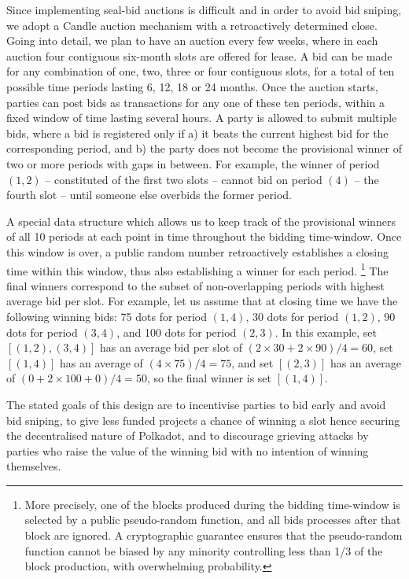 Since implementing seal-bid auctions is difficult and in order to avoid bid sniping, we adopt a Candle auction \cite{Fuellbrunn:2012:CandleAuction} mechanism with a retroactively determined close. 
Going into detail, we plan to have an auction every few weeks, where in each auction four contiguous six-month slots are offered for lease. A bid can be made for any combination of one, two, three or four contiguous slots, for a total of ten possible time periods lasting 6, 12, 18 or 24 months. Once the auction starts, parties can post bids as transactions for any one of these ten periods, within a fixed window of time lasting several hours. A party is allowed to submit multiple bids, where a bid is registered only if a) it beats the current highest bid for the corresponding period, and b) the party does not become the provisional winner of two or more periods with gaps in between. For example, the winner of period $(1,2)$ -- constituted of the first two slots -- cannot bid on period $(4)$ -- the fourth slot -- until someone else overbids the former period. 

A special data structure which allows us to keep track of the provisional winners of all 10 periods at each point in time throughout the bidding time-window. Once this window is over, a public random number retroactively establishes a closing time within this window, thus also establishing a winner for each period.%
\footnote{More precisely, one of the blocks produced during the bidding time-window is selected by a public pseudo-random function, and all bids processes after that block are ignored. A cryptographic guarantee ensures that the pseudo-random function cannot be biased by any minority controlling less than 1/3 of the block production, with overwhelming probability.} %
The final winners correspond to the subset of non-overlapping periods with highest average bid per slot. For example, let us assume that at closing time we have the following winning bids: 75 dots for period $(1,4)$, 30 dots for period $(1,2)$, 90 dots for period $(3,4)$, and 100 dots for period $(2,3)$. In this example, set $[(1,2), (3,4)]$ has an average bid per slot of $(2\times 30 + 2\times 90)/4 = 60$, set $[(1,4)]$ has an average of $(4\times 75)/4 = 75$, and set $[(2,3)]$ has an average of $(0+2\times 100+0)/4=50$, so the final winner is set $[(1,4)]$. 

The stated goals of this design are to incentivise parties to bid early and avoid bid sniping, to give less funded projects a chance of winning a slot hence securing the decentralised nature of Polkadot, and to discourage grieving attacks by parties who raise the value of the winning bid with no intention of winning themselves.

